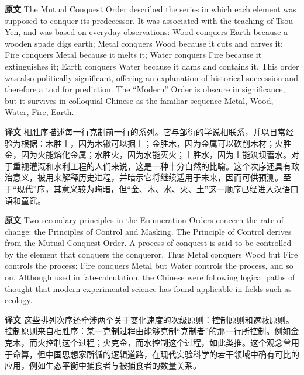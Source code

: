\documentclass[UTF8,zihao=-4]{ctexart}
\newcommand{\BodyFont}{\fontsize{10.5pt}{15.5pt}\selectfont}
\newcommand{\origlabel}{\textbf{原文}\quad}
\newcommand{\translabel}{\textbf{译文}\quad}
\newenvironment{enblock}{\par\noindent\begingroup\BodyFont\origlabel}{\par\endgroup}
\newenvironment{zhblock}{\par\noindent\begingroup\BodyFont\translabel}{\par\endgroup\vspace{0.35em}}
\begin{document}
\begin{enblock}
The Mutual Conquest Order described the series in which each element was supposed to conquer its predecessor. It was associated with the teaching of Tsou Yen, and was based on everyday observations: Wood conquers Earth because a wooden spade digs earth; Metal conquers Wood because it cuts and carves it; Fire conquers Metal because it melts it; Water conquers Fire because it extinguishes it; Earth conquers Water because it dams and contains it. This order was also politically significant, offering an explanation of historical succession and therefore a tool for prediction. The ``Modern'' Order is obscure in significance, but it survives in colloquial Chinese as the familiar sequence Metal, Wood, Water, Fire, Earth.
\end{enblock}
\begin{zhblock}
相胜序描述每一行克制前一行的系列。它与邹衍的学说相联系，并以日常经验为根据：木胜土，因为木锹可以掘土；金胜木，因为金属可以砍削木材；火胜金，因为火能熔化金属；水胜火，因为水能灭火；土胜水，因为土能筑坝蓄水。对于重视灌溉和水利工程的人们来说，这是一种十分自然的比喻。这个次序还具有政治意义，被用来解释历史进程，并暗示它将继续适用于未来，因而可供预测。至于“现代”序，其意义较为晦暗，但“金、木、水、火、土”这一顺序已经进入汉语口语和童谣。
\end{zhblock}

\begin{enblock}
Two secondary principles in the Enumeration Orders concern the rate of change: the Principles of Control and Masking. The Principle of Control derives from the Mutual Conquest Order. A process of conquest is said to be controlled by the element that conquers the conqueror. Thus Metal conquers Wood but Fire controls the process; Fire conquers Metal but Water controls the process, and so on. Although used in fate-calculation, the Chinese were following logical paths of thought that modern experimental science has found applicable in fields such as ecology.
\end{enblock}
\begin{zhblock}
这些排列次序还牵涉两个关于变化速度的次级原则：控制原则和遮蔽原则。控制原则来自相胜序：某一克制过程由能够克制“克制者”的那一行所控制。例如金克木，而火控制这个过程；火克金，而水控制这个过程，如此类推。这个观念曾用于命算，但中国思想家所循的逻辑道路，在现代实验科学的若干领域中确有可比的应用，例如生态平衡中捕食者与被捕食者的数量关系。
\end{zhblock}
\end{document}
